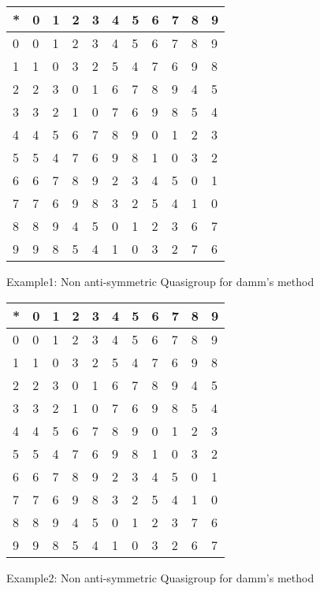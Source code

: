 \begin{figure}[htb]
 \begin{center}
\begin{tabular}{| l || l | l | l | l | l | l | l | l | l | l |}
 \hline
* & 0 & 1 & 2 & 3 & 4 & 5 & 6 & 7 & 8 & 9\\
\hline\hline
0 & 0 & 1 & 2 & 3 & 4 & 5 & 6 & 7 & 8 & 9\\
\hline
1 & 1 & 0 & 3 & 2 & 5 & 4 & 7 & 6 & 9 & 8\\
\hline
2 & 2 & 3 & 0 & 1 & 6 & 7 & 8 & 9 & 4 & 5\\
\hline
3 & 3 & 2 & 1 & 0 & 7 & 6 & 9 & 8 & 5 & 4\\
\hline
4 & 4 & 5 & 6 & 7 & 8 & 9 & 0 & 1 & 2 & 3\\
\hline
5 & 5 & 4 & 7 & 6 & 9 & 8 & 1 & 0 & 3 & 2\\
\hline
6 & 6 & 7 & 8 & 9 & 2 & 3 & 4 & 5 & 0 & 1\\
\hline
7 & 7 & 6 & 9 & 8 & 3 & 2 & 5 & 4 & 1 & 0\\
\hline
8 & 8 & 9 & 4 & 5 & 0 & 1 & 2 & 3 & 6 & 7\\
\hline
9 & 9 & 8 & 5 & 4 & 1 & 0 & 3 & 2 & 7 & 6\\
\hline
\end{tabular}
 \end{center}
\caption{Example1: Non anti-symmetric Quasigroup for damm's method}
\label{fig:10digitsQuasiNotdamm1}
\end{figure}

\begin{figure}[htb]
 \begin{center}
\begin{tabular}{| l || l | l | l | l | l | l | l | l | l | l |}
 \hline
* & 0 & 1 & 2 & 3 & 4 & 5 & 6 & 7 & 8 & 9\\
\hline\hline
0 & 0 & 1 & 2 & 3 & 4 & 5 & 6 & 7 & 8 & 9\\
\hline
1 & 1 & 0 & 3 & 2 & 5 & 4 & 7 & 6 & 9 & 8\\
\hline
2 & 2 & 3 & 0 & 1 & 6 & 7 & 8 & 9 & 4 & 5\\
\hline
3 & 3 & 2 & 1 & 0 & 7 & 6 & 9 & 8 & 5 & 4\\
\hline
4 & 4 & 5 & 6 & 7 & 8 & 9 & 0 & 1 & 2 & 3\\
\hline
5 & 5 & 4 & 7 & 6 & 9 & 8 & 1 & 0 & 3 & 2\\
\hline
6 & 6 & 7 & 8 & 9 & 2 & 3 & 4 & 5 & 0 & 1\\
\hline
7 & 7 & 6 & 9 & 8 & 3 & 2 & 5 & 4 & 1 & 0\\
\hline
8 & 8 & 9 & 4 & 5 & 0 & 1 & 2 & 3 & 7 & 6\\
\hline
9 & 9 & 8 & 5 & 4 & 1 & 0 & 3 & 2 & 6 & 7\\
\hline
\end{tabular}
 \end{center}
\caption{Example2: Non anti-symmetric Quasigroup for damm's method}
\label{fig:10digitsQuasiNotdamm2}
\end{figure}


